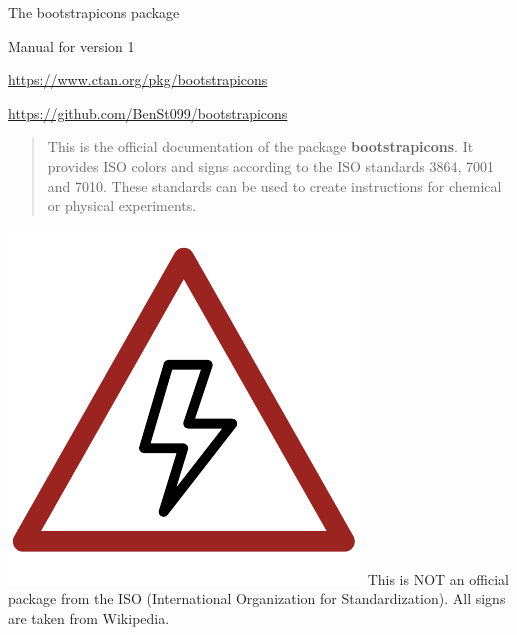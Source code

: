 \documentclass{article}
\begin{document}
\newpage
\thispagestyle{empty}
\begin{center}
    \begin{tcolorbox}[colback=white,colframe=gray-700, width=7cm,halign=center,boxrule=0.2mm]
        {\Large The {\sffamily bootstrapicons} package}

        Manual for version 1
    \end{tcolorbox}\vspace{15mm}

    \href{https://www.ctan.org/pkg/bootstrapicons}{\textcolor{blue-700}{https://www.ctan.org/pkg/bootstrapicons}}\vspace{6mm}

    \href{https://github.com/BenSt099/bootstrapicons}{\textcolor{blue-700}{https://github.com/BenSt099/bootstrapicons}}
\end{center}\vspace{7mm}

\begin{abstract}
\noindent This is the official documentation of the package \textbf{bootstrapicons}. It provides ISO colors and signs according to the ISO standards
3864, 7001 and 7010. These standards can be used to create instructions for chemical or physical experiments.
\end{abstract}\vspace{10mm}

\begin{tcolorbox}[leftrule=3mm,colback=red-200,colframe=red-800,lower separated=false,sidebyside,lefthand width=1.5cm]
    \includegraphics[scale=0.25]{danger.pdf}\tcblower {\bf\textcolor{red-800}{ATTENTION!}} This is NOT an official package from the ISO (International Organization for Standardization). All signs are taken from Wikipedia.
\end{tcolorbox}
\end{document}

